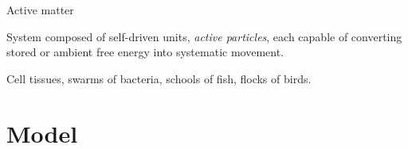 \documentclass{beamer}
\begin{document}
\begin{frame}{Active matter}

\begin{definition}
System composed of self-driven units, \textit{active particles}, each capable of converting stored or ambient free energy into systematic movement.
\end{definition}
\pause
\begin{example}
Cell tissues, swarms of bacteria, schools of fish, flocks of birds.
\end{example}

\end{frame}

\section{Model}
\end{document}
